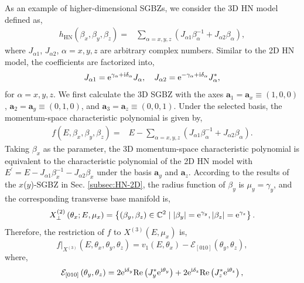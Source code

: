As an example of higher-dimensional SGBZs, we consider the 3D HN model
defined as, 
\begin{align}
h_{\text{HN}}\left(\beta_{x},\beta_{y},\beta_{z}\right)= & \sum_{\alpha=x,y,z}\left(J_{\alpha1}\beta_{\alpha}^{-1}+J_{\alpha2}\beta_{\alpha}\right),
\end{align}
where $J_{\alpha1}$, $J_{\alpha2}$, $\alpha=x,y,z$ are arbitrary
complex numbers. Similar to the 2D HN model, the coefficients are
factorized into, 
\begin{equation}
J_{\alpha1}=\mathrm{e}^{\gamma_{\alpha}+\mathrm{i}\delta_{\alpha}}J_{\alpha},\quad J_{\alpha2}=\mathrm{e}^{-\gamma_{\alpha}+\mathrm{i}\delta_{\alpha}}J_{\alpha}^{*},
\end{equation}
for $\alpha=x,y,z$. We first calculate the 3D SGBZ with the axes
$\mathbf{a}_{1}=\mathbf{a}_{x}\equiv(1,0,0)$, $\mathbf{a}_{2}=\mathbf{a}_{y}\equiv(0,1,0)$,
and $\mathbf{a}_{3}=\mathbf{a}_{z}\equiv(0,0,1)$. Under the selected
basis, the momentum-space characteristic polynomial is given by, 
\begin{align}
f\left(E,\beta_{x},\beta_{y},\beta_{z}\right)= & E-\sum_{\alpha=x,y,z}\left(J_{\alpha1}\beta_{\alpha}^{-1}+J_{\alpha2}\beta_{\alpha}\right).
\end{align}
Taking $\beta_{x}$ as the parameter, the 3D momentum-space characteristic
polynomial is equivalent to the characteristic polynomial of the 2D
HN model with $E^{\prime}=E-J_{\alpha1}\beta_{x}^{-1}-J_{\alpha2}\beta_{x}$
under the basis $\mathbf{a}_{y}$ and $\mathbf{a}_{z}$. According
to the results of the $x$($y$)-SGBZ in Sec. \ref{subsec:HN-2D},
the radius function of $\beta_{y}$ is $\mu_{y}=\gamma_{y}$, and
the corresponding transverse base manifold is, 
\begin{equation}
X_{\perp}^{(2)}\left(\theta_{x};E,\mu_{x}\right)=\left\{ \left(\beta_{y},\beta_{z}\right)\in\mathbb{C}^{2}\mid\left|\beta_{y}\right|=\mathrm{e}^{\gamma_{y}},\left|\beta_{z}\right|=\mathrm{e}^{\gamma_{z}}\right\} .
\end{equation}
Therefore, the restriction of $f$ to $X^{(3)}(E,\mu_{x})$ is, 
\begin{equation}
f|_{X^{(3)}}\left(E,\theta_{x},\theta_{y},\theta_{z}\right)=v_{1}\left(E,\theta_{x}\right)-\mathcal{E}_{[010]}\left(\theta_{y},\theta_{z}\right),\label{eq:3D-ChP-1}
\end{equation}
where, 
\begin{equation}
\mathcal{E}_{[010]}\left(\theta_{y},\theta_{z}\right)=2\mathrm{e}^{\mathrm{i}\delta_{y}}\text{Re}\left(J_{y}^{*}\mathrm{e}^{\mathrm{i}\theta_{y}}\right)+2\mathrm{e}^{\mathrm{i}\delta_{z}}\text{Re}\left(J_{z}^{*}\mathrm{e}^{\mathrm{i}\theta_{z}}\right),
\end{equation}
